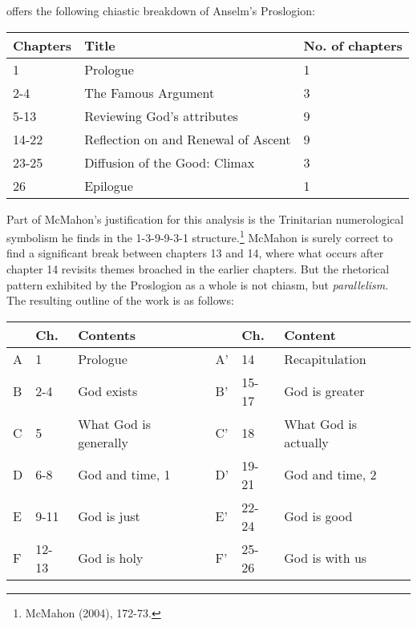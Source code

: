 \documentclass[]{amsart}
\begin{document}
\cite[166]{McMahon2004} offers the following chiastic breakdown of Anselm's Proslogion:

\bigskip

\begin{tabular}{l|l|l}
Chapters & Title & No. of chapters\\ \hline
1 & Prologue & 1\\ 
2-4 & The Famous Argument & 3\\ 
5-13 & Reviewing God's attributes & 9\\ 
14-22 & Reflection on and Renewal of Ascent & 9\\ 
23-25 & Diffusion of the Good: Climax & 3\\ 
26 & Epilogue & 1\\
\end{tabular}

\bigskip

Part of McMahon's justification for this analysis is the Trinitarian numerological symbolism he finds in the 1-3-9-9-3-1 structure.\footnote{McMahon (2004), 172-73.}  McMahon is surely correct to find a significant break between chapters 13 and 14, where what occurs after chapter 14 revisits themes broached in the earlier chapters. But the rhetorical pattern exhibited by the Proslogion as a whole is not chiasm, but \textit{parallelism}. The resulting outline of the work is as follows:

\bigskip

\begin{tabular}{l|l|l|l|l|l}
& Ch. & Contents & & Ch. & Content \\ \hline
A & 1 & Prologue & A' & 14 & Recapitulation \\
B & 2-4 & God exists & B' & 15-17 & God is greater \\
C & 5 & What God is generally & C' & 18 & What God is actually\\
D & 6-8 & God and time, 1 & D' & 19-21 & God and time, 2 \\
E & 9-11 & God is just & E' & 22-24 & God is good \\
F & 12-13 & God is holy & F' & 25-26 & God is with us \\
\end{tabular}

\bigskip
\end{document}
